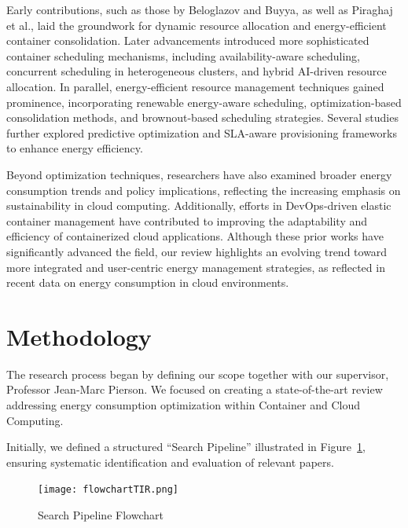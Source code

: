 \documentclass[runningheads]{llncs}
\begin{document}
Early contributions, such as those by Beloglazov and Buyya\cite{beloglazov_energy_2010}, as well as 
Piraghaj et al.\cite{piraghaj_framework_2015}, laid the groundwork for dynamic resource allocation and 
energy-efficient container consolidation. Later advancements introduced more sophisticated container 
scheduling mechanisms, including availability-aware scheduling\cite{alahmad_availability-aware_2018}, 
concurrent scheduling in heterogeneous clusters\cite{hu_concurrent_2020}, and hybrid AI-driven resource 
allocation\cite{tan_hybrid_2019}.
In parallel, energy-efficient resource management techniques gained prominence, incorporating renewable 
energy-aware scheduling\cite{kumar_renewable_2019}, optimization-based consolidation methods\cite{shi_energy-aware_2018, piraghaj_framework_2015}, 
and brownout-based scheduling strategies\cite{xu_energy_2016}. Several studies further explored 
predictive optimization and SLA-aware provisioning frameworks to enhance energy 
efficiency\cite{dabbagh_energy-efficient_2015, hameed_survey_2016, li_sla-aware_2018, bui_energy_2017, 
carrega_energy-aware_2017}.

Beyond optimization techniques, researchers have also examined broader energy consumption trends and policy implications\cite{avgerinou_trends_2017}, 
reflecting the increasing emphasis on sustainability in cloud computing. Additionally, efforts in DevOps-driven elastic container management have contributed 
to improving the adaptability and efficiency of containerized cloud applications\cite{barna_delivering_2017}.
Although these prior works have significantly advanced the field, our review highlights an evolving trend toward more integrated and user-centric energy 
management strategies, as reflected in recent data on energy consumption in cloud environments\cite{masanet_2020, hintemann_2022, IEADataCentres}.

\section{Methodology}
The research process began by defining our scope together with our supervisor, Professor Jean-Marc Pierson. We focused on creating a state-of-the-art review 
addressing energy consumption optimization within Container and Cloud Computing.

Initially, we defined a structured ``Search Pipeline'' illustrated in Figure~\ref{fig:search_pipeline}, ensuring systematic identification and evaluation of relevant papers.

\begin{figure}[H]
    \centering
    \texttt{[image: flowchartTIR.png]}
    \caption{Search Pipeline Flowchart}\label{fig:search_pipeline}
\end{figure}
\end{document}
